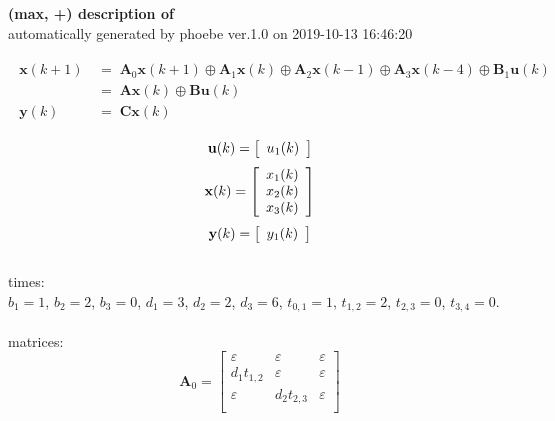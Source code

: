 \documentclass[11pt, a4paper, fleqn]{article}
\begin{document}
\noindent
\textbf{(max, +) description of} \texttt{\currfilebase} \\
automatically generated by phoebe ver.1.0 on 2019-10-13 16:46:20 

\begin{align}\begin{split}
\mathbf{x}(k+1) & \, = \; \mathbf{A}_{0}\mathbf{x}(k+1) \oplus \mathbf{A}_{1}\mathbf{x}(k) \oplus \mathbf{A}_{2}\mathbf{x}(k-1) \oplus \mathbf{A}_{3}\mathbf{x}(k-4) \oplus \mathbf{B}_{1}\mathbf{u}(k)\\
& \, = \; \mathbf{Ax}(k) \oplus \mathbf{Bu}(k)\\
\mathbf{y}(k) & \, = \; \mathbf{Cx}(k)
\end{split}\end{align}

\begin{equation*}
\mathbf{u}(k) = 
\left[\begin{array}{*{20}c}
  u_1(k) \\
\end{array}\right]
\end{equation*}
\begin{equation*}
\mathbf{x}(k) = 
\left[\begin{array}{*{20}c}
  x_1(k) \\
  x_2(k) \\
  x_3(k) \\
\end{array}\right]
\end{equation*}
\begin{equation*}
\mathbf{y}(k) = 
\left[\begin{array}{*{20}c}
  y_1(k) \\
\end{array}\right]
\end{equation*}
\noindent\\
times:\\
$b_1 = 1$, $b_2 = 2$, $b_3 = 0$, $d_1 = 3$, $d_2 = 2$, $d_3 = 6$, $t_{0,1} = 1$, $t_{1,2} = 2$, $t_{2,3} = 0$, $t_{3,4} = 0$.\\
\\
matrices:
\begin{equation*}
\mathbf{A}_{0} = 
\left[\begin{array}{ ccc }
\varepsilon	&\varepsilon	&\varepsilon\\
d_1t_{1,2}	&\varepsilon	&\varepsilon\\
\varepsilon	&d_2t_{2,3}	&\varepsilon\\
\end{array}\right]
\end{equation*}
\end{document}
